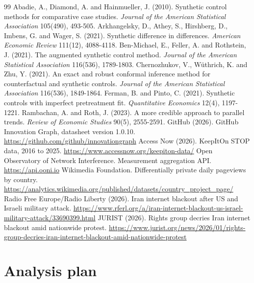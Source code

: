 \documentclass[11pt]{article}
\begin{document}

\begin{thebibliography}{99}
 Abadie, A., Diamond, A. and Hainmueller, J. (2010). Synthetic control methods for comparative case studies. \emph{Journal of the American Statistical Association} 105(490), 493-505.
 Arkhangelsky, D., Athey, S., Hirshberg, D., Imbens, G. and Wager, S. (2021). Synthetic difference in differences. \emph{American Economic Review} 111(12), 4088-4118.
 Ben-Michael, E., Feller, A. and Rothstein, J. (2021). The augmented synthetic control method. \emph{Journal of the American Statistical Association} 116(536), 1789-1803.
 Chernozhukov, V., W\"uthrich, K. and Zhu, Y. (2021). An exact and robust conformal inference method for counterfactual and synthetic controls. \emph{Journal of the American Statistical Association} 116(536), 1849-1864.
 Ferman, B. and Pinto, C. (2021). Synthetic controls with imperfect pretreatment fit. \emph{Quantitative Economics} 12(4), 1197-1221.
 Rambachan, A. and Roth, J. (2023). A more credible approach to parallel trends. \emph{Review of Economic Studies} 90(5), 2555-2591.
 GitHub (2026). GitHub Innovation Graph, datasheet version 1.0.10. \url{https://github.com/github/innovationgraph}
 Access Now (2026). KeepItOn STOP data, 2016 to 2025. \url{https://www.accessnow.org/keepiton-data/}
 Open Observatory of Network Interference. Measurement aggregation API. \url{https://api.ooni.io}
 Wikimedia Foundation. Differentially private daily pageviews by country. \url{https://analytics.wikimedia.org/published/datasets/country_project_page/}
 Radio Free Europe/Radio Liberty (2026). Iran internet blackout after US and Israeli military attack. \url{https://www.rferl.org/a/iran-internet-blackout-us-israel-military-attack/33690399.html}
 JURIST (2026). Rights group decries Iran internet blackout amid nationwide protest. \url{https://www.jurist.org/news/2026/01/rights-group-decries-iran-internet-blackout-amid-nationwide-protest}
\end{thebibliography}

\appendix
\section{Analysis plan}
\label{app:plan}

\end{document}
